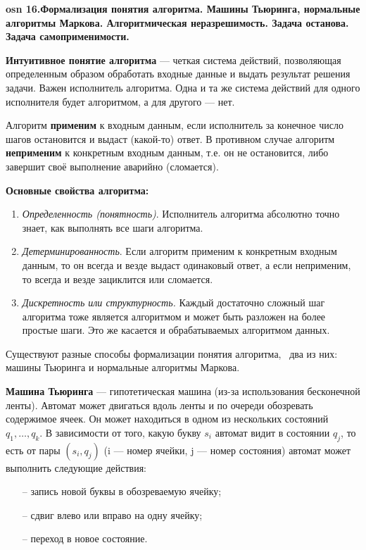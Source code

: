 \textbf{\LARGE osn 16.Формализация понятия алгоритма. Машины Тьюринга, нормальные алгоритмы Маркова. Алгоритмическая неразрешимость. Задача останова. Задача самоприменимости.}


\textbf{Интуитивное понятие алгоритма} --- четкая система действий, позволяющая определенным образом обработать входные данные и выдать результат решения задачи. Важен исполнитель алгоритма. Одна и та же система действий для одного исполнителя будет алгоритмом, а для другого --- нет.

Алгоритм \textbf{применим} к входным данным, если исполнитель за конечное число шагов остановится и выдаст (какой-то) ответ. В противном случае алгоритм \textbf{неприменим} к конкретным входным данным, т.е. он не остановится, либо завершит своё выполнение аварийно (сломается).

\textbf{Основные свойства алгоритма:}
\begin{enumerate}
    \item\textit{Определенность (понятность)}. Исполнитель алгоритма абсолютно точно знает, как выполнять все шаги алгоритма.
    \item \textit{Детерминированность}. Если алгоритм применим к конкретным входным данным, то он всегда и везде выдаст одинаковый ответ, а если неприменим, то всегда и везде зациклится или сломается.
    \item \textit{Дискретность или структурность.} Каждый достаточно сложный шаг алгоритма тоже является алгоритмом и может быть разложен на более простые шаги. Это же касается и обрабатываемых алгоритмом данных.
\end{enumerate}

Существуют разные способы формализации понятия алгоритма, \faEye \ два из них: машины Тьюринга и нормальные алгоритмы Маркова.


\textbf{Машина Тьюринга} --- гипотетическая машина (из-за использования бесконечной ленты). Автомат может двигаться вдоль ленты и по очереди обозревать содержимое ячеек. Он может находиться в одном из нескольких состояний $q_1,\dots, q_k$. В зависимости от того, какую букву $s_i$ автомат видит в состоянии $q_j$, то есть от пары $(s_i,q_j)$ (i --- номер ячейки, j --- номер состояния) автомат может выполнить следующие действия:
\begin{itemize}
    \item[--] запись новой буквы в обозреваемую ячейку; 
    \item[--] сдвиг влево или вправо на одну ячейку;
    \item[--] переход в новое состояние.
\end{itemize}


